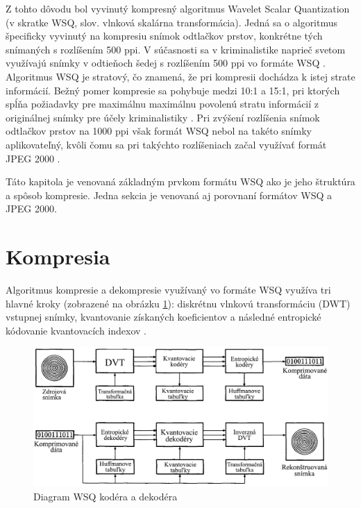   Z tohto dôvodu bol vyvinutý kompresný algoritmus Wavelet Scalar Quantization (v skratke WSQ, slov. vlnková skalárna transformácia).
  Jedná sa o algoritmus špecificky vyvinutý na kompresiu snímok odtlačkov prstov, konkrétne tých snímaných s rozlíšením 500 ppi. V súčasnosti sa
  v kriminalistike naprieč svetom využívajú snímky v odtieňoch šedej s rozlíšením 500 ppi vo formáte WSQ \cite{Libert}.
  Algoritmus WSQ je stratový, čo znamená, že pri kompresii dochádza k istej strate informácií. Bežný pomer kompresie sa pohybuje medzi 10:1 a 15:1,
  pri ktorých spĺňa požiadavky pre maximálnu maximálnu povolenú stratu informácií z originálnej snímky pre účely kriminalistiky \cite{Handbook}.
  Pri zvýšení rozlíšenia snímok odtlačkov prstov na 1000 ppi však formát WSQ nebol na takéto snímky aplikovateľný, kvôli čomu sa pri takýchto rozlíšeniach
  začal využívať formát JPEG 2000 \cite{Libert}.

  Táto kapitola je venovaná základným prvkom formátu WSQ ako je jeho štruktúra a spôsob kompresie. Jedna sekcia je venovaná aj porovnaní formátov
  WSQ a JPEG 2000.

  \section{Kompresia}
  Algoritmus kompresie a dekompresie využívaný vo formáte WSQ využíva tri hlavné kroky (zobrazené na obrázku \ref{obr:WSQ_diagram}):
  diskrétnu vlnkovú transformáciu (DWT) vstupnej snímky, kvantovanie získaných koeficientov a následné entropické kódovanie kvantovacích indexov \cite{Bradley}.

  \begin{figure}[]
    \centering
    \includegraphics[width=0.8\linewidth]{obrazky-figures/WSQ_encoder_decoder.png}
    \caption{Diagram WSQ kodéra a dekodéra \cite{Bradley}}
    \label{obr:WSQ_diagram}
  \end{figure}
  
